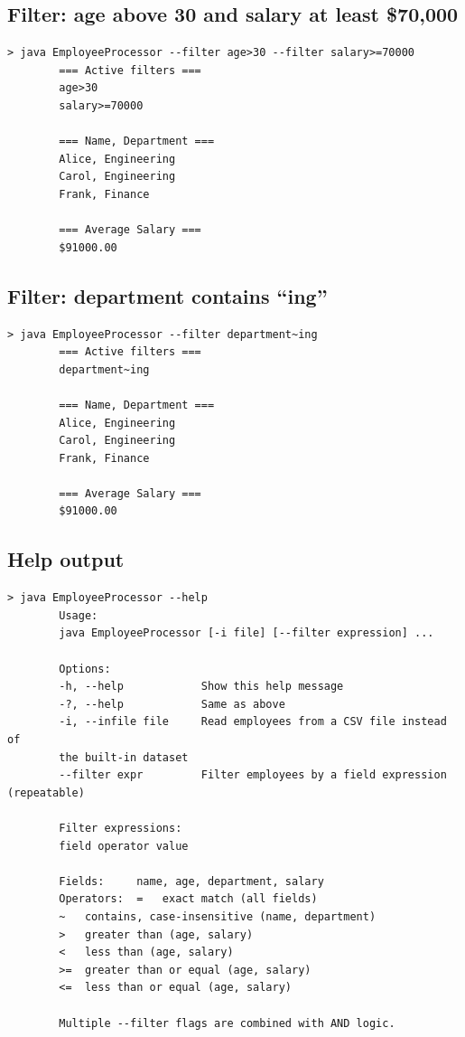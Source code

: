 \documentclass[12pt, a4paper]{article}
\begin{document}
	\subsection{Filter: age above 30 and salary at least \$70,000}
	
	\begin{lstlisting}[style=output]
		> java EmployeeProcessor --filter age>30 --filter salary>=70000
		=== Active filters ===
		age>30
		salary>=70000
		
		=== Name, Department ===
		Alice, Engineering
		Carol, Engineering
		Frank, Finance
		
		=== Average Salary ===
		$91000.00
	\end{lstlisting}
	
	\subsection{Filter: department contains ``ing''}
	
	\begin{lstlisting}[style=output]
		> java EmployeeProcessor --filter department~ing
		=== Active filters ===
		department~ing
		
		=== Name, Department ===
		Alice, Engineering
		Carol, Engineering
		Frank, Finance
		
		=== Average Salary ===
		$91000.00
	\end{lstlisting}
	
	\subsection{Help output}
	
	\begin{lstlisting}[style=output]
		> java EmployeeProcessor --help
		Usage:
		java EmployeeProcessor [-i file] [--filter expression] ...
		
		Options:
		-h, --help            Show this help message
		-?, --help            Same as above
		-i, --infile file     Read employees from a CSV file instead of
		the built-in dataset
		--filter expr         Filter employees by a field expression (repeatable)
		
		Filter expressions:
		field operator value
		
		Fields:     name, age, department, salary
		Operators:  =   exact match (all fields)
		~   contains, case-insensitive (name, department)
		>   greater than (age, salary)
		<   less than (age, salary)
		>=  greater than or equal (age, salary)
		<=  less than or equal (age, salary)
		
		Multiple --filter flags are combined with AND logic.
	\end{lstlisting}
	
\end{document}
